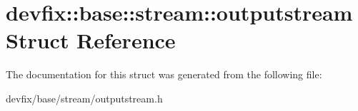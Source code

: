 \hypertarget{structdevfix_1_1base_1_1stream_1_1outputstream}{}\section{devfix\+:\+:base\+:\+:stream\+:\+:outputstream Struct Reference}
\label{structdevfix_1_1base_1_1stream_1_1outputstream}


The documentation for this struct was generated from the following file\+:\begin{DoxyCompactItemize}
\item 
devfix/base/stream/outputstream.\+h\end{DoxyCompactItemize}
